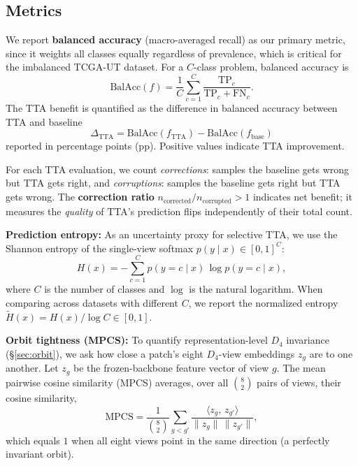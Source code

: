 \documentclass{melba}
\begin{document}
\subsection{Metrics}
We report \textbf{balanced accuracy} (macro-averaged recall) as our primary metric, since it weights all classes equally regardless of prevalence, which is critical for the imbalanced TCGA-UT dataset. For a $C$-class problem, balanced accuracy is
\begin{equation}
  \text{BalAcc}(f)=\frac{1}{C}\sum_{c=1}^{C}\frac{\text{TP}_c}{\text{TP}_c+\text{FN}_c}.
\end{equation}
The TTA benefit is quantified as the difference in balanced accuracy between TTA and baseline
\begin{equation}
  \Delta_{\text{TTA}} = \text{BalAcc}(f_{\text{TTA}}) - \text{BalAcc}(f_{\text{base}})
\end{equation}
reported in percentage points (pp). Positive values indicate TTA improvement.

For each TTA evaluation, we count \emph{corrections}: samples the baseline gets wrong but TTA gets right, and \emph{corruptions}: samples the baseline gets right but TTA gets wrong. The \textbf{correction ratio} $n_{\text{corrected}}/n_{\text{corrupted}} > 1$ indicates net benefit; it measures the \emph{quality} of TTA's prediction flips independently of their total count.

\textbf{Prediction entropy:} As an uncertainty proxy for selective TTA, we use the Shannon entropy of the single-view softmax $p(y\mid x)\in[0,1]^C$:
\begin{equation}
  H(x) = -\sum_{c=1}^{C} p(y=c\mid x)\,\log p(y=c\mid x),
\end{equation}
where $C$ is the number of classes and $\log$ is the natural logarithm. When comparing across datasets with different $C$, we report the normalized entropy $\tilde{H}(x)=H(x)/\log C\in[0,1]$.

\textbf{Orbit tightness (MPCS):} To quantify representation-level $D_4$ invariance (\S\ref{sec:orbit}), we ask how close a patch's eight $D_4$-view embeddings $z_g$ are to one another. Let $z_g$ be the frozen-backbone feature vector of view $g$. The mean pairwise cosine similarity (MPCS) averages, over all $\binom{8}{2}$ pairs of views, their cosine similarity,
\begin{equation} \label{MPCS}
  \text{MPCS} = \frac{1}{\binom{8}{2}} \sum_{g < g'} \frac{\langle z_g,\, z_{g'} \rangle}{\lVert z_g\rVert\,\lVert z_{g'}\rVert},
\end{equation}
which equals $1$ when all eight views point in the same direction (a perfectly invariant orbit).
\end{document}
